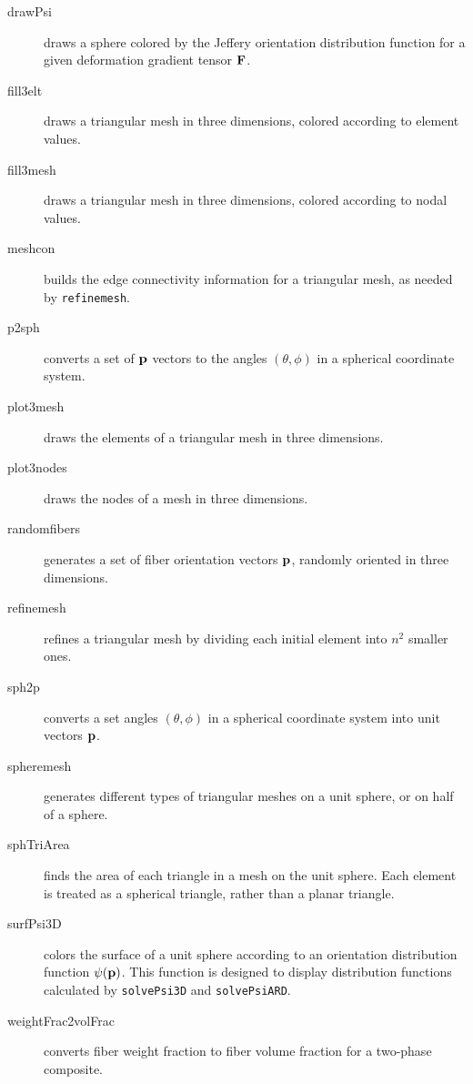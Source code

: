 \documentclass[11pt]{article}
\begin{document}
\begin{description}
    
    \item[drawPsi]{draws a sphere colored by the Jeffery orientation distribution function for a given deformation gradient tensor $\mathbf{F}$.}

    \item[fill3elt]{draws a triangular mesh in three dimensions, colored according to element values.}

    \item[fill3mesh]{draws a triangular mesh in three dimensions, colored according to nodal values.}

    \item[meshcon]{builds the edge connectivity information for a triangular mesh, as needed by \texttt{refinemesh}.}

    \item[p2sph]{converts a set of $\mathbf{p}$ vectors to the angles $(\theta, \phi)$ in a spherical coordinate system.}

    \item[plot3mesh]{draws the elements of a triangular mesh in three dimensions.}

    \item[plot3nodes]{draws the nodes of a mesh in three dimensions.}
    
    \item[randomfibers]{generates a set of fiber orientation vectors $\mathbf{p}$, randomly oriented in three dimensions.}

    \item[refinemesh]{refines a triangular mesh by dividing each initial element into $n^2$ smaller ones.}

    \item[sph2p]{converts a set angles $(\theta, \phi)$ in a spherical coordinate system into unit vectors $\mathbf{p}$.}

    \item[spheremesh]{generates different types of triangular meshes on a unit sphere, or on half of a sphere.}

    \item[sphTriArea]{finds the area of each triangle in a mesh on the unit sphere.  Each element is treated as a spherical triangle, rather than a planar triangle.}

    \item[surfPsi3D]{colors the surface of a unit sphere according to an orientation distribution function $\psi (\mathbf{p})$.  This function is designed to display distribution functions calculated by \texttt{solvePsi3D} and \texttt{solvePsiARD}.}

    \item[weightFrac2volFrac]{converts fiber weight fraction to fiber volume fraction for a two-phase composite.}
    
    
\end{description}
\end{document}
